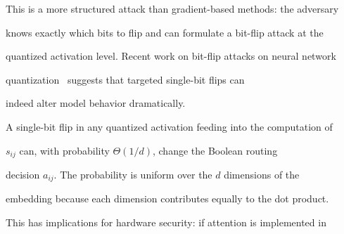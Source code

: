 This is a more structured attack than gradient-based methods: the adversary






knows exactly which bits to flip and can formulate a bit-flip attack at the






quantized activation level.  Recent work on bit-flip attacks on neural network






quantization~\cite{bitflip2023} suggests that targeted single-bit flips can






indeed alter model behavior dramatically.













\begin{conjecture}






A single-bit flip in any quantized activation feeding into the computation of






$s_{ij}$ can, with probability $\Theta(1/d)$, change the Boolean routing






decision $a_{ij}$.  The probability is uniform over the $d$ dimensions of the






embedding because each dimension contributes equally to the dot product.






\end{conjecture}













This has implications for hardware security: if attention is implemented in






